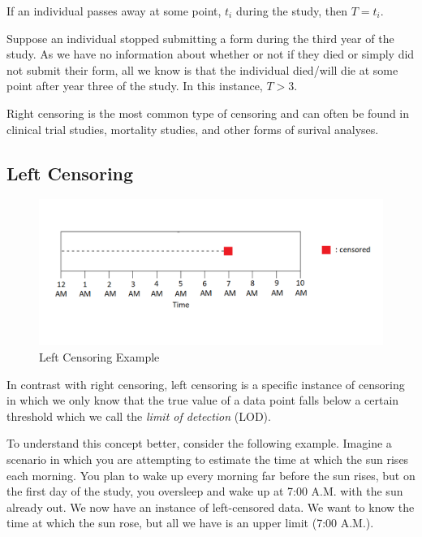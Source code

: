 \documentclass[12pt, twoside]{amherstthesis}
\begin{document}
If an individual passes away at some point, \(t_i\) during the study, then \(T = t_i\).

Suppose an individual stopped submitting a form during the third year of the study. As we have no information about whether or not if they died or simply did not submit their form, all we know is that the individual died/will die at some point after year three of the study. In this instance, \(T > 3\).

Right censoring is the most common type of censoring and can often be found in clinical trial studies, mortality studies, and other forms of surival analyses.

\hypertarget{left}{%
\subsection{Left Censoring}\label{left}}
\begin{figure}

{\centering \includegraphics[width=1\linewidth]{figures/left_censoring_example_fix} 

}

\caption{Left Censoring Example}\label{fig:leftcensoringexample}
\end{figure}
In contrast with right censoring, left censoring is a specific instance of censoring in which we only know that the true value of a data point falls below a certain threshold which we call the \emph{limit of detection} (LOD).

To understand this concept better, consider the following example. Imagine a scenario in which you are attempting to estimate the time at which the sun rises each morning. You plan to wake up every morning far before the sun rises, but on the first day of the study, you oversleep and wake up at 7:00 A.M. with the sun already out. We now have an instance of left-censored data. We want to know the time at which the sun rose, but all we have is an upper limit (7:00 A.M.).
\end{document}
